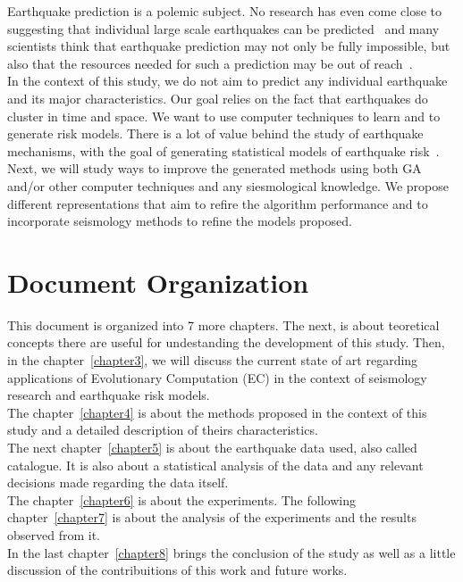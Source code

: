 Earthquake prediction is a polemic subject. No research has even come close to suggesting that individual large scale earthquakes can be predicted~\cite{ecta14} and many scientists think that earthquake prediction may not only be fully impossible, but also that the resources needed for such a prediction may be out of reach~\cite{eberhard2014multiscale}.\\

In the context of this study, we do not aim to predict any individual earthquake and its major characteristics. Our goal relies on the fact that earthquakes do cluster in time and space. We want to use computer techniques to learn and to generate risk models. There is a lot of value behind the study of earthquake mechanisms, with the goal of generating statistical models of earthquake risk~\cite{Nature1999}.\\

Next, we will study ways to improve the generated methods using both GA and/or other computer techniques and any siesmological knowledge. We propose different representations that aim to refire the algorithm performance and to incorporate seismology methods to refine the models proposed.\\

\section{Document Organization}

This document is organized into 7 more chapters. The next, is about teoretical concepts there are useful for undestanding the development of this study. Then, in the chapter~\ref{chapter3}, we will discuss the current state of art regarding applications of Evolutionary Computation (EC) in the context of seismology research and earthquake risk models. \\


The chapter~\ref{chapter4} is about the methods proposed in the context of this study and a detailed description of theirs characteristics.\\

The next chapter~\ref{chapter5} is about the earthquake data used, also called catalogue. It is also about a statistical analysis of the data and any relevant decisions made regarding the data itself.\\

The chapter~\ref{chapter6} is about the experiments. The following chapter~\ref{chapter7} is about the analysis of the experiments and the results observed from it.\\

In the last chapter~\ref{chapter8} brings the conclusion of the study as well as a little discussion of the contribuitions of this work and future works.\\


